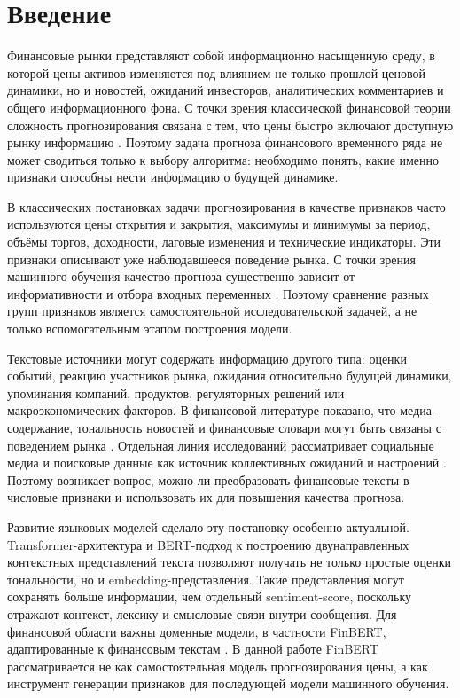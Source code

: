 \section*{Введение}

Финансовые рынки представляют собой информационно насыщенную среду, в которой цены активов изменяются под влиянием не только прошлой ценовой динамики, но и новостей, ожиданий инвесторов, аналитических комментариев и общего информационного фона. С точки зрения классической финансовой теории сложность прогнозирования связана с тем, что цены быстро включают доступную рынку информацию \cite{fama1970efficient}. Поэтому задача прогноза финансового временного ряда не может сводиться только к выбору алгоритма: необходимо понять, какие именно признаки способны нести информацию о будущей динамике.

В классических постановках задачи прогнозирования в качестве признаков часто используются цены открытия и закрытия, максимумы и минимумы за период, объёмы торгов, доходности, лаговые изменения и технические индикаторы. Эти признаки описывают уже наблюдавшееся поведение рынка. С точки зрения машинного обучения качество прогноза существенно зависит от информативности и отбора входных переменных \cite{guyon2003feature}. Поэтому сравнение разных групп признаков является самостоятельной исследовательской задачей, а не только вспомогательным этапом построения модели.

Текстовые источники могут содержать информацию другого типа: оценки событий, реакцию участников рынка, ожидания относительно будущей динамики, упоминания компаний, продуктов, регуляторных решений или макроэкономических факторов. В финансовой литературе показано, что медиа-содержание, тональность новостей и финансовые словари могут быть связаны с поведением рынка \cite{tetlock2007media,loughran2011liability,kearney2014textual,nassirtoussi2014text}. Отдельная линия исследований рассматривает социальные медиа и поисковые данные как источник коллективных ожиданий и настроений \cite{bollen2011twitter,mao2011sentiment}. Поэтому возникает вопрос, можно ли преобразовать финансовые тексты в числовые признаки и использовать их для повышения качества прогноза.

Развитие языковых моделей сделало эту постановку особенно актуальной. Transformer-архитектура \cite{vaswani2017attention} и BERT-подход к построению двунаправленных контекстных представлений текста \cite{devlin2019bert} позволяют получать не только простые оценки тональности, но и embedding-представления. Такие представления могут сохранять больше информации, чем отдельный sentiment-score, поскольку отражают контекст, лексику и смысловые связи внутри сообщения. Для финансовой области важны доменные модели, в частности FinBERT, адаптированные к финансовым текстам \cite{araci2019finbert,yang2020finbert}. В данной работе FinBERT рассматривается не как самостоятельная модель прогнозирования цены, а как инструмент генерации признаков для последующей модели машинного обучения.

